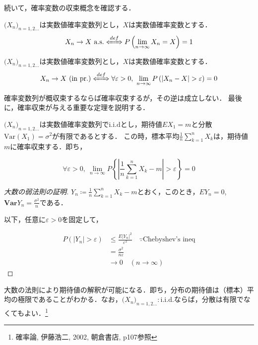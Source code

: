 \documentclass{classes/myclass}
\begin{document}
続いて，確率変数の収束概念を確認する．

\begin{dfn}[概収束]
$\lparen X_n \rparen_{n = 1, 2...}$は実数値確率変数列とし，$X$は実数値確率変数とする．
\[
    X_n \rightarrow X \ \mathrm{a.s.} \xLeftrightarrow[]{def} P \left \lparen \lim_{n \to \infty} X_n = X \right \rparen = 1
\]
\end{dfn}

\begin{dfn}[確率収束]
$\lparen X_n \rparen_{n = 1, 2...}$は実数値確率変数列とし，$X$は実数値確率変数とする．
\[
  X_n \rightarrow X \ (\mathrm{in \ pr.}) \xLeftrightarrow[]{def} \forall \varepsilon > 0, \  \lim_{n \to \infty} P \left \lparen |X_n - X| > \varepsilon \right \rparen = 0
\]
\end{dfn}

確率変数列が概収束するならば確率収束するが，その逆は成立しない．
最後に，確率収束が与える重要な定理を説明する．

\begin{thm}[大数の弱法則]
$\lparen X_n \rparen_{n = 1, 2...}$は実数値確率変数列で$\mathrm{i.i.d}$とし，期待値$EX_1 = m$と分散$\mathrm{Var}(X_1) = \sigma^2$が有限であるとする．
この時，標本平均$\frac{1}{n}\sum_{k = 1}^{n}X_k$は，期待値$m$に確率収束する．即ち，

\[
  \forall \varepsilon > 0, \ \lim_{n \to \infty}P\left \lbrace \left|\frac{1}{n}\sum_{k = 1}^{n}X_k - m \right | > \varepsilon \right \rbrace  = 0
\]
\end{thm}

\begin{proof}[大数の弱法則の証明]
$Y_n \coloneq \frac{1}{n} \sum_{k = 1}^n X_k - m$とおく，このとき，$EY_n = 0$, $\mathbf{Var}Y_n = \frac{\sigma^2}{n}$である．

以下，任意に$\varepsilon > 0$を固定して，

\begin{align*}
  P(|Y_n| > \varepsilon) &\leq \frac{E|Y_n|^2}{\varepsilon^2} \quad \because \text{Chebyshev's ineq} \\
  &= \frac{\sigma^2}{n\varepsilon} \\
  &\rightarrow 0 \quad (n \to \infty)
\end{align*}
\end{proof}

大数の法則により期待値の解釈が可能になる．即ち，分布の期待値は（標本）平均の極限であることがわかる．なお，$\lparen X_n \rparen_{n = 1, 2...} : \mathrm{i.i.d.}$ならば，分散は有限でなくてもよい．\footnote{確率論, 伊藤浩二, 2002, 朝倉書店, p107参照}
\end{document}
